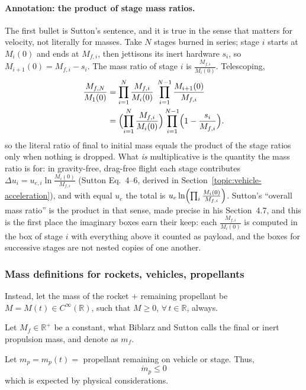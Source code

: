 \paragraph*{Annotation: the product of stage mass ratios.}
The first bullet is Sutton's sentence, and it is true in the sense that
matters for velocity, not literally for masses. Take $N$ stages burned in
series; stage $i$ starts at $M_i(0)$ and ends at $M_{f,i}$, then jettisons
its inert hardware $s_i$, so $M_{i+1}(0)=M_{f,i}-s_i$. The mass ratio
of stage $i$ is $\frac{M_{f,i}}{M_i(0)}$. Telescoping,
\[
\begin{aligned}
 \frac{M_{f,N}}{M_1(0)}
 &=\prod_{i=1}^{N}\frac{M_{f,i}}{M_i(0)}\;
  \prod_{i=1}^{N-1}\frac{M_{i+1}(0)}{M_{f,i}}\\
 &=\Bigl(\prod_{i=1}^{N}\frac{M_{f,i}}{M_i(0)}\Bigr)
  \prod_{i=1}^{N-1}\Bigl(1-\frac{s_i}{M_{f,i}}\Bigr).
\end{aligned}
\]
so the literal ratio of final to initial mass equals the product of the stage
ratios only when nothing is dropped. What \emph{is} multiplicative is the
quantity the mass ratio is for: in gravity-free, drag-free flight each stage
contributes $\Delta u_i=u_{e,i}\ln\frac{M_i(0)}{M_{f,i}}$ (Sutton Eq.~4--6, derived
in Section~\ref{topic:vehicle-acceleration}), and with
equal $u_e$ the total is $u_e\ln\Bigl(\prod_i\frac{M_i(0)}{M_{f,i}}\Bigr)$. Sutton's ``overall
mass ratio'' is the product in that sense, made precise in his Section~4.7,
and this is the first place the imaginary boxes earn their keep:
each $\frac{M_{f,i}}{M_i(0)}$ is computed in the box of stage $i$ with everything above
it counted as payload, and the boxes for successive stages are not nested
copies of one another.

\subsubsection{Mass definitions for rockets, vehicles, propellants}

Instead, let the mass of the rocket $+$ remaining propellant be
$M = M(t) \in C^{\infty}(\mathbb{R})$, such that $M \geq 0$,
$\forall \, t \in \mathbb{R}$, always.

Let $M_f \in \mathbb{R}^+$ be a constant, what Biblarz and Sutton calls the
final or inert propulsion mass, and denote as $m_f$.

Let $m_p = m_p(t) = $ propellant remaining on vehicle or stage. Thus,
\begin{equation}
\dot{m}_p \leq 0
\end{equation}
which is expected by physical considerations.


